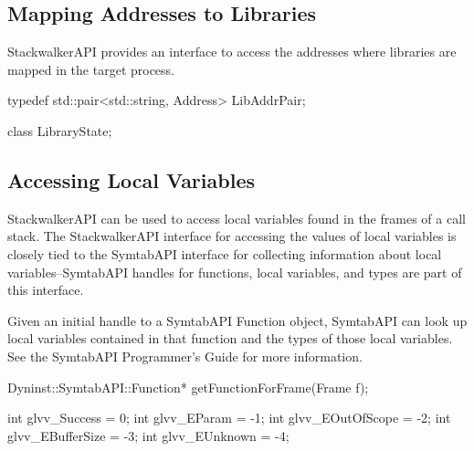 \subsection{Mapping Addresses to Libraries}
\label{subsec:libmapping}

StackwalkerAPI provides an interface to access the addresses where libraries are mapped in the
target process.

\begin{apient}
typedef std::pair<std::string, Address> LibAddrPair;
\end{apient}

\begin{apient}
class LibraryState;
\end{apient}

\subsection{Accessing Local Variables}

StackwalkerAPI can be used to access local variables found in the frames of a
call stack. The StackwalkerAPI interface for accessing the values of local
variables is closely tied to the SymtabAPI interface for collecting information
about local variables--SymtabAPI handles for functions, local variables, and
types are part of this interface.

Given an initial handle to a SymtabAPI Function object, SymtabAPI can look up
local variables contained in that function and the types of those local
variables. See the SymtabAPI Programmer's Guide for more information.

\begin{apient}
Dyninst::SymtabAPI::Function* getFunctionForFrame(Frame f);
\end{apient}

\begin{apient}
int glvv_Success = 0;
int glvv_EParam = -1;
int glvv_EOutOfScope = -2;
int glvv_EBufferSize = -3;
int glvv_EUnknown = -4;
\end{apient}

